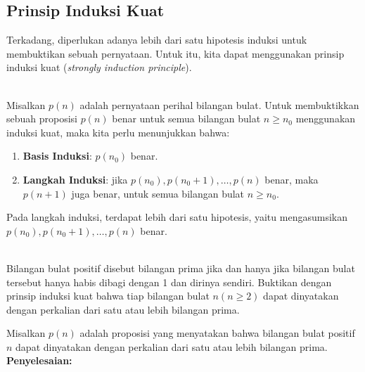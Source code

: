 \documentclass[11pt]{article}
\theoremstyle{definitionstyle}
\theoremstyle{theoremstyle}
\theoremstyle{examplestyle}
\begin{document}
\subsection{Prinsip Induksi Kuat}
Terkadang, diperlukan adanya lebih dari satu hipotesis induksi untuk membuktikan sebuah pernyataan. Untuk itu, kita dapat menggunakan prinsip induksi kuat (\textit{strongly induction principle}).
\begin{theorem} \hfill \\
    Misalkan $p(n)$ adalah pernyataan perihal bilangan bulat. Untuk membuktikkan sebuah proposisi $p(n)$ benar untuk semua bilangan bulat $n \ge n_0$ menggunakan induksi kuat, maka kita perlu menunjukkan bahwa:
    \begin{enumerate}[left=0pt, itemsep=1.5pt, topsep=1.5pt, label=\roman*), leftmargin=1.5em]
        \item \textbf{Basis Induksi}: $p(n_0)$ benar.
        \item \textbf{Langkah Induksi}: jika $p(n_0), p(n_0 + 1), \dots, p(n)$ benar, maka $p(n + 1)$ juga benar, untuk semua bilangan bulat $n \ge n_0$.
    \end{enumerate}
    Pada langkah induksi, terdapat lebih dari satu hipotesis, yaitu mengasumsikan \\
    $p(n_0), p(n_0 + 1), \dots, p(n)$ benar.
\end{theorem}
\begin{example} \hfill \\
    Bilangan bulat positif disebut bilangan prima jika dan hanya jika bilangan bulat tersebut hanya habis dibagi dengan 1 dan dirinya sendiri. Buktikan dengan prinsip induksi kuat bahwa tiap bilangan bulat $n (n \ge 2)$ dapat dinyatakan dengan perkalian dari satu atau lebih bilangan prima.
\end{example}
Misalkan $p(n)$ adalah proposisi yang menyatakan bahwa bilangan bulat positif $n$ dapat dinyatakan dengan perkalian dari satu atau lebih bilangan prima. \\ 
\textbf{Penyelesaian: }
\end{document}
